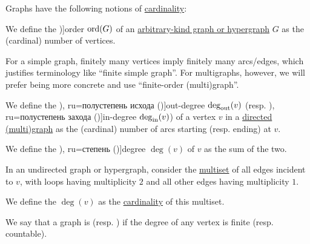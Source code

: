 \begin{definition}\label{def:graph_cardinality}
  Graphs have the following notions of \hyperref[thm:cardinality_existence]{cardinality}:
  \begin{thmenum}
     We define the \term[ru=порядок (\cite[9]{ЕмеличевИПр1990Графы})]{order} \( \operatorname{ord}(G) \) of an \hyperref[rem:arbitrary_kind_graph]{arbitrary-kind graph or hypergraph} \( G \) as the (cardinal) number of vertices.

    For a simple graph, finitely many vertices imply finitely many arcs/edges, which justifies terminology like \enquote{finite simple graph}. For multigraphs, however, we will prefer being more concrete and use \enquote{finite-order (multi)graph}.

     We define the \term[bg=полустепен на изхода (\cite[8]{Мирчев2001Графи}), ru=полустепень исхода (\cite[283]{ЕмеличевИПр1990Графы})]{out-degree} \( \deg_{\op{out}}(v) \) (resp. \term[bg=полустепен на входа (\cite[8]{Мирчев2001Графи}), ru=полустепень захода (\cite[283]{ЕмеличевИПр1990Графы})]{in-degree} \( \deg_{\op{in}}(v) \)) of a vertex \( v \) in a \hyperref[def:directed_multigraph]{directed (multi)graph} as the (cardinal) number of arcs starting (resp. ending) at \( v \).

    We define the \term[bg=степен (\cite[8]{Мирчев2001Графи}), ru=степень (\cite[283]{ЕмеличевИПр1990Графы})]{degree} \( \deg(v) \) of \( v \) as the sum of the two.

    \mimprovised In an undirected graph or hypergraph, consider the \hyperref[def:multiset]{multiset} of all edges incident to \( v \), with loops having multiplicity \( 2 \) and all other edges having multiplicity \( 1 \).

    We define the  \( \deg(v) \) as the \hyperref[def:multiset/cardinality]{cardinality} of this multiset.

     We say that a graph is  (resp. ) if the degree of any vertex is finite (resp. countable).
  \end{thmenum}
\end{definition}


